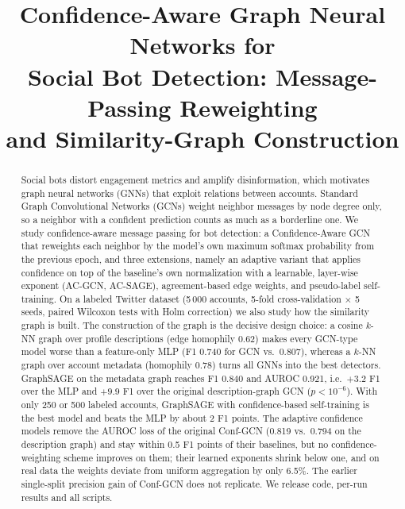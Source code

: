 \documentclass[conference]{IEEEtran}
\begin{document}
\title{Confidence-Aware Graph Neural Networks for\\ Social Bot Detection: Message-Passing Reweighting\\ and Similarity-Graph Construction}

\author{
\and
{}
}

\maketitle

\begin{abstract}
Social bots distort engagement metrics and amplify disinformation, which motivates graph neural networks (GNNs) that exploit relations between accounts. Standard Graph Convolutional Networks (GCNs) weight neighbor messages by node degree only, so a neighbor with a confident prediction counts as much as a borderline one. We study confidence-aware message passing for bot detection: a Confidence-Aware GCN that reweights each neighbor by the model's own maximum softmax probability from the previous epoch, and three extensions, namely an adaptive variant that applies confidence on top of the baseline's own normalization with a learnable, layer-wise exponent (AC-GCN, AC-SAGE), agreement-based edge weights, and pseudo-label self-training. On a labeled Twitter dataset (5\,000 accounts, 5-fold cross-validation $\times$ 5 seeds, paired Wilcoxon tests with Holm correction) we also study how the similarity graph is built. The construction of the graph is the decisive design choice: a cosine $k$-NN graph over profile descriptions (edge homophily 0.62) makes every GCN-type model worse than a feature-only MLP (F1 0.740 for GCN vs.\ 0.807), whereas a $k$-NN graph over account metadata (homophily 0.78) turns all GNNs into the best detectors. GraphSAGE on the metadata graph reaches F1 0.840 and AUROC 0.921, i.e.\ $+3.2$ F1 over the MLP and $+9.9$ F1 over the original description-graph GCN ($p<10^{-6}$). With only 250 or 500 labeled accounts, GraphSAGE with confidence-based self-training is the best model and beats the MLP by about 2 F1 points. The adaptive confidence models remove the AUROC loss of the original Conf-GCN (0.819 vs.\ 0.794 on the description graph) and stay within 0.5 F1 points of their baselines, but no confidence-weighting scheme improves on them; their learned exponents shrink below one, and on real data the weights deviate from uniform aggregation by only 6.5\%. The earlier single-split precision gain of Conf-GCN does not replicate. We release code, per-run results and all scripts.
\end{abstract}
\end{document}
